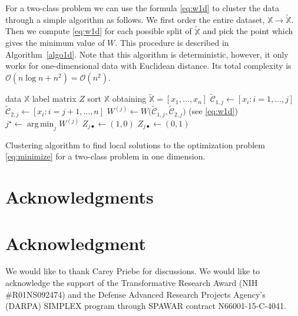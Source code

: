 \documentclass[10pt,journal,compsoc]{IEEEtran}
\DeclareMathOperator*{\argmin}{arg\,min}
\newcommand\C{{\mathcal{C}}}
\newcommand\tC{{\widetilde{\C}}}
\newcommand\OO{{\mathcal{O}}}
\begin{document}
For a two-class problem we can use the formula
\eqref{eq:w1d} to cluster the data
through a simple algorithm
as follows. We first order
the entire dataset, $\mathbb{X} \to \widetilde{\mathbb{X}}$. Then
we compute \eqref{eq:w1d} for each possible split of $\widetilde{\mathbb{X}}$
and pick the point which gives the minimum value of $W$.
This procedure is described in Algorithm~\ref{algo1d}.
Note that this algorithm is deterministic,
however,
it only works for one-dimensional data with Euclidean distance. Its total
complexity is $\OO(n\log n + n^2) = \OO(n^2)$.


\begin{algorithm}[h]
\vspace{.5em}
\begin{algorithmic}[1]
\INPUT data $\mathbb{X}$
\OUTPUT label matrix $Z$
\STATE sort $\mathbb{X}$ obtaining
$\widetilde{\mathbb{X}}= [ x_1,\dotsc,x_n ]$
        \STATE $\tC_{1,j} \leftarrow [x_i: i=1,\dotsc,j]$
        \STATE $\tC_{2,j} \leftarrow [x_i : i=j+1,\dotsc,n]$
        \STATE
            $W^{(j)} \leftarrow W \big( \tC_{1,j},\tC_{2,j}\big)$
            \hfill (see \eqref{eq:w1d})
    \ENDFOR
    \STATE $j^\star \leftarrow \argmin_j W^{(j)}$
    		\STATE $Z_{j\bullet} \leftarrow (1,0) $
        \ELSE
			\STATE $Z_{j\bullet} \leftarrow (0,1)$
		\ENDIF
	\ENDFOR
\end{algorithmic}
\caption{
\label{algo1d}
Clustering algorithm to
find local solutions to the optimization
problem \eqref{eq:minimize}
for a two-class problem in one dimension. 
}
\end{algorithm}



\ifCLASSOPTIONcompsoc
  \section*{Acknowledgments}
\else
  \section*{Acknowledgment}
\fi

We would like to thank Carey Priebe for discussions.
We would like to acknowledge the support of the Transformative
Research Award (NIH \#R01NS092474) and  the Defense Advanced Research Projects
Agency’s (DARPA) SIMPLEX program through SPAWAR contract N66001-15-C-4041.
\end{document}
